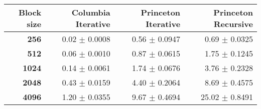 \begin{tabular}{rrrr}\toprule
\textbf{Block size}  & \textbf{Columbia Iterative} & \textbf{Princeton Iterative} & \textbf{Princeton Recursive}\\\midrule
\textbf{256}  & 0.02 $\pm$ 0.0008 & 0.56 $\pm$ 0.0947 & 0.69 $\pm$ 0.0325\\
\textbf{512}  & 0.06 $\pm$ 0.0010 & 0.87 $\pm$ 0.0615 & 1.75 $\pm$ 0.1245\\
\textbf{1024}  & 0.14 $\pm$ 0.0061 & 1.74 $\pm$ 0.0676 & 3.76 $\pm$ 0.2328\\
\textbf{2048}  & 0.43 $\pm$ 0.0159 & 4.40 $\pm$ 0.2064 & 8.69 $\pm$ 0.4575\\
\textbf{4096} & 1.20 $\pm$ 0.0355 & 9.67 $\pm$ 0.4694 & 25.02 $\pm$ 0.8491\\
\bottomrule
\end{tabular}
